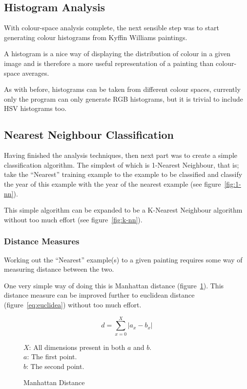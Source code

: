 \documentclass[11pt,fleqn,twoside]{article}
\begin{document}
\subsection{Histogram Analysis}
With colour-space analysis complete, the next sensible step was to start generating colour 
histograms from Kyffin Williams paintings.

A histogram is a nice way of displaying the distribution of colour in a given image and is 
therefore a more useful representation of a painting than colour-space averages.

As with before, histograms can be taken from different colour spaces, currently only the program
can only generate RGB histograms, but it is trivial to include HSV histograms too.

\subsection{Nearest Neighbour Classification}
Having finished the analysis techniques, then next part was to create a simple classification 
algorithm. The simplest of which is 1-Nearest Neighbour, that is; take the ``Nearest'' training
example to the example to be classified and classify the year of this example with the year of the
nearest example (see figure~\ref{fig:1-nn}).

This simple algorithm can be expanded to be a K-Nearest Neighbour algorithm without too much effort
(see figure~\ref{fig:k-nn}).


\subsubsection{Distance Measures}
Working out the ``Nearest'' example(s) to a given painting requires some way of measuring distance
between the two.

One very simple way of doing this is Manhattan distance (figure~\ref{eq:manhattan}). This distance
measure can be improved further to euclidean distance (figure~\ref{eq:euclidea}) without too much
effort.


\begin{figure}[p]
\[
d = \sum^X_{x=0}{|a_x - b_x|}
\]

\(X\): All dimensions present in both \(a\) and \(b\).\\
\(a\): The first point.\\
\(b\): The second point.

\caption{Manhattan Distance}
\label{eq:manhattan}
\end{figure}
\end{document}
